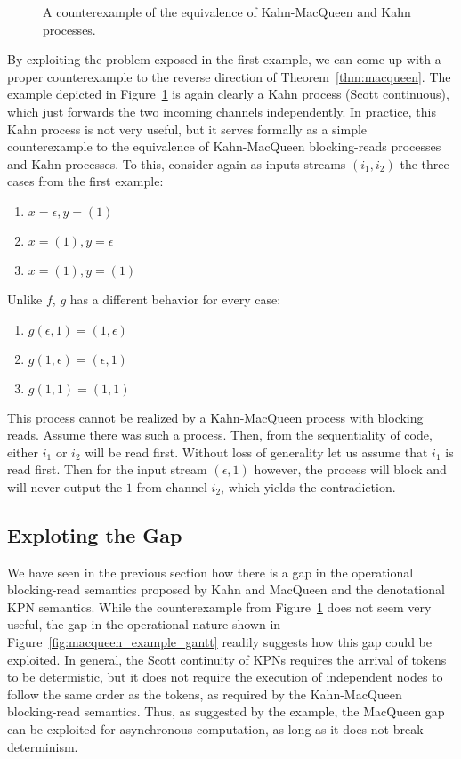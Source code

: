 \begin{figure}[h]
   \resizebox{0.85\textwidth}{!}{}
	\caption{A counterexample of the equivalence of Kahn-MacQueen and Kahn processes.}
	\label{fig:macqueen_proper_counterexample}
\end{figure}

By exploiting the problem exposed in the first example, we can come up with a proper counterexample to the reverse direction of Theorem~\ref{thm:macqueen}.
The example depicted in Figure~\ref{fig:macqueen_proper_counterexample} is again clearly a Kahn process (Scott continuous), which just forwards the two incoming channels independently.
In practice, this Kahn process is not very useful, but it serves formally as a simple counterexample to the equivalence of Kahn-MacQueen blocking-reads processes and Kahn processes.
To this, consider again as inputs streams $(i_1,i_2)$ the three cases from the first example: 
\begin{enumerate}
\item $x = \epsilon, y = (1)$
\item $x = (1), y = \epsilon$
\item $x = (1), y = (1)$
\end{enumerate}

Unlike $f$, $g$ has a different behavior for every case:
\begin{enumerate}
\item $g(\epsilon,1) = (1,\epsilon)$
\item $g(1,\epsilon) = (\epsilon,1)$
\item $g(1,1) = (1,1)$
\end{enumerate}

This process cannot be realized by a Kahn-MacQueen process with blocking reads. Assume there was such a process. Then, from the sequentiality of code, either $i_1$ or $i_2$ will be read first. Without loss of generality let us assume that $i_1$ is read first. Then for the input stream $(\epsilon,1)$ however, the process will block and will never output the $1$ from channel $i_2$, which yields the contradiction.


\subsection{Exploting the Gap}
We have seen in the previous section how there is a gap in the operational blocking-read semantics proposed by Kahn and MacQueen and the denotational \ac{KPN} semantics. While the counterexample from Figure~\ref{fig:macqueen_proper_counterexample} does not seem very useful, the gap in the operational nature shown in Figure~\ref{fig:macqueen_example_gantt} readily suggests how this gap could be exploited.
In general, the Scott continuity of \acp{KPN} requires the arrival of tokens to be determistic, but it does not require the execution of independent nodes to follow the same order as the tokens, as required by the Kahn-MacQueen blocking-read semantics. Thus, as suggested by the example, the MacQueen gap can be exploited for asynchronous computation, as long as it does not break determinism.

